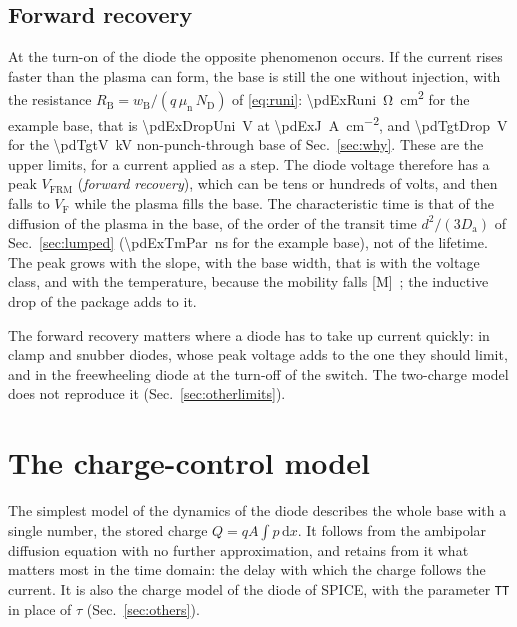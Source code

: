 \documentclass[10pt,a4paper]{scrartcl}
\newcommand{\VF}{V_\mathrm{F}}
\newcommand{\diff}{\mathrm{d}}
\newcommand{\ND}{N_\mathrm{D}}
\newcommand{\wB}{w_\mathrm{B}}
\newcommand{\Da}{D_\mathrm{a}}
\newcommand{\mun}{\mu_\mathrm{n}}
\begin{document}
\subsection{Forward recovery}
\label{sec:forwardrec}
At the turn-on of the diode the opposite phenomenon occurs. If the current rises faster than the plasma can form, the base is still the one without injection, with the resistance $R_\mathrm{B} = \wB/(q\,\mun\,\ND)$ of \eqref{eq:runi}: \SI{\pdExRuni}{\ohm\centi\metre\squared} for the example base, that is \SI{\pdExDropUni}{\volt} at \SI{\pdExJ}{\ampere\per\centi\metre\squared}, and \SI{\pdTgtDrop}{\volt} for the \SI{\pdTgtV}{\kilo\volt} non-punch-through base of Sec.~\ref{sec:why}. These are the upper limits, for a current applied as a step. The diode voltage therefore has a peak $V_\mathrm{FRM}$ (\emph{forward recovery}), which can be tens or hundreds of volts, and then falls to $\VF$ while the plasma fills the base. The characteristic time is that of the diffusion of the plasma in the base, of the order of the transit time $d^2/(3\Da)$ of Sec.~\ref{sec:lumped} (\SI{\pdExTmPar}{\nano\second} for the example base), not of the lifetime. The peak grows with the slope, with the base width, that is with the voltage class, and with the temperature, because the mobility falls [M]~\cite{lutz}; the inductive drop of the package adds to it.

The forward recovery matters where a diode has to take up current quickly: in clamp and snubber diodes, whose peak voltage adds to the one they should limit, and in the freewheeling diode at the turn-off of the switch. The two-charge model does not reproduce it (Sec.~\ref{sec:otherlimits}).
\section{The charge-control model}
\label{sec:chargecontrol}
The simplest model of the dynamics of the diode describes the whole base with a single number, the stored charge $Q = qA\int p\,\diff x$. It follows from the ambipolar diffusion equation with no further approximation, and retains from it what matters most in the time domain: the delay with which the charge follows the current. It is also the charge model of the diode of SPICE, with the parameter \texttt{TT} in place of $\tau$ (Sec.~\ref{sec:others}).
\end{document}

